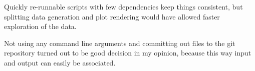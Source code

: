 \documentclass[../main.tex]{subfiles}
\begin{document}
Quickly re-runnable scripts with few dependencies keep things consistent, but splitting data generation and plot rendering would have allowed faster exploration of the data.

Not using any command line arguments and committing out files to the git repository turned out to be good decision in my opinion, because this way input and output can easily be associated.
\end{document}
